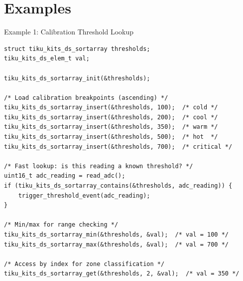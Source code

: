 \documentclass[aspectratio=169, 10pt]{beamer}
\begin{document}
\section{Examples}

\begin{frame}[fragile]{Example 1: Calibration Threshold Lookup}
\begin{lstlisting}[style=cstyle,
  title={examples/example\_ds\_sortarray.c --- ADC threshold lookup}]
struct tiku_kits_ds_sortarray thresholds;
tiku_kits_ds_elem_t val;

tiku_kits_ds_sortarray_init(&thresholds);

/* Load calibration breakpoints (ascending) */
tiku_kits_ds_sortarray_insert(&thresholds, 100);  /* cold */
tiku_kits_ds_sortarray_insert(&thresholds, 200);  /* cool */
tiku_kits_ds_sortarray_insert(&thresholds, 350);  /* warm */
tiku_kits_ds_sortarray_insert(&thresholds, 500);  /* hot  */
tiku_kits_ds_sortarray_insert(&thresholds, 700);  /* critical */

/* Fast lookup: is this reading a known threshold? */
uint16_t adc_reading = read_adc();
if (tiku_kits_ds_sortarray_contains(&thresholds, adc_reading)) {
    trigger_threshold_event(adc_reading);
}

/* Min/max for range checking */
tiku_kits_ds_sortarray_min(&thresholds, &val);  /* val = 100 */
tiku_kits_ds_sortarray_max(&thresholds, &val);  /* val = 700 */

/* Access by index for zone classification */
tiku_kits_ds_sortarray_get(&thresholds, 2, &val);  /* val = 350 */
\end{lstlisting}
\end{frame}
\end{document}

